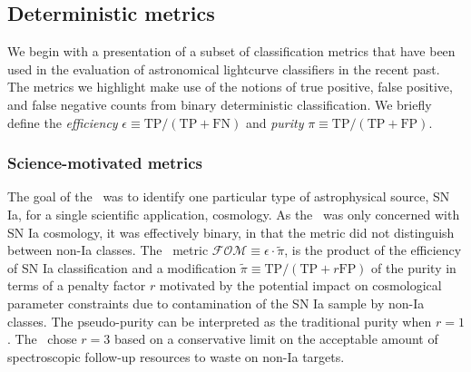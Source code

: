 \subsection{Deterministic metrics}
\label{sec:deterministic}

We begin with a presentation of a subset of classification metrics that have been used in the evaluation of astronomical lightcurve classifiers in the recent past.
The metrics we highlight make use of the notions of true positive, false positive, and false negative counts from binary deterministic classification.
We briefly define the \textit{efficiency} $\epsilon \equiv \mathrm{TP} / (\mathrm{TP} + \mathrm{FN})$ and \textit{purity} $\pi \equiv \mathrm{TP} / (\mathrm{TP} + \mathrm{FP})$.

\subsubsection{Science-motivated metrics}
\label{sec:science}

The goal of the \snphotcc\ was to identify one particular type of astrophysical source, SN Ia, for a single scientific application, cosmology.
As the \snphotcc\ was only concerned with SN Ia cosmology, it was effectively binary, in that the metric did not distinguish between non-Ia classes.
The \snphotcc\ metric $\mathcal{FOM} \equiv \epsilon \cdot \tilde{\pi}$,
is the product of the efficiency
of SN Ia classification and a modification $\tilde{\pi} \equiv \mathrm{TP} / (\mathrm{TP} + r \mathrm{FP})$ of the purity in terms of a penalty factor $r$
motivated by the potential impact on cosmological parameter constraints due to contamination of the SN Ia sample by non-Ia classes.
The pseudo-purity can be interpreted as the traditional purity when $r = 1$.
The \snphotcc\ chose $r = 3$ based on a conservative limit on the acceptable amount of spectroscopic follow-up resources to waste on non-Ia targets.

